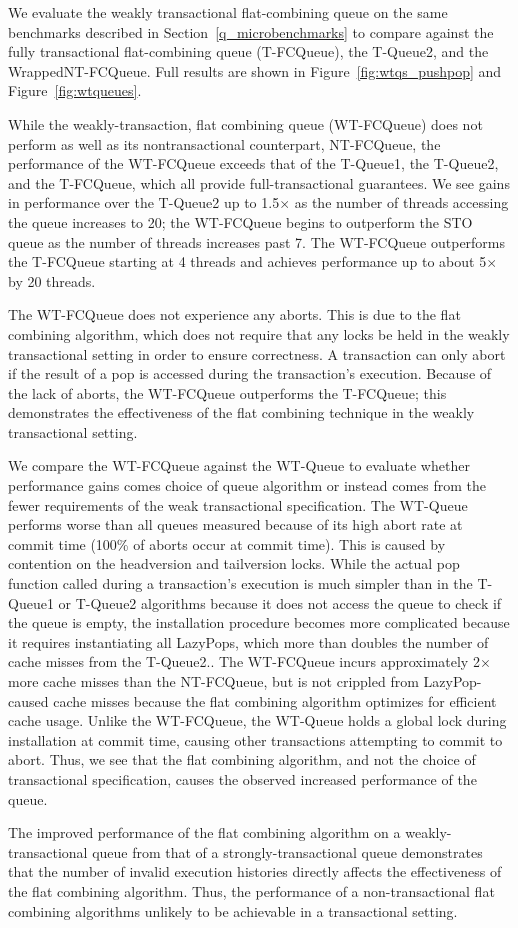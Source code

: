 We evaluate the weakly transactional flat-combining queue on the same benchmarks described in Section~\ref{q_microbenchmarks} to compare against the fully transactional flat-combining queue (T-FCQueue), the T-Queue2, and the WrappedNT-FCQueue. Full results are shown in Figure~\ref{fig:wtqs_pushpop} and Figure~\ref{fig:wtqueues}.

While the weakly-transaction, flat combining queue (WT-FCQueue) does not perform as well as its nontransactional counterpart, NT-FCQueue, the performance of the WT-FCQueue exceeds that of the T-Queue1, the T-Queue2, and the T-FCQueue, which all provide full-transactional guarantees. We see gains in performance over the T-Queue2 up to 1.5$\times$ as the number of threads accessing the queue increases to 20; the WT-FCQueue begins to outperform the STO queue as the number of threads increases past 7. The WT-FCQueue outperforms the T-FCQueue starting at 4 threads and achieves performance up to about 5$\times$ by 20 threads.
 
The WT-FCQueue does not experience any aborts. This is due to the flat combining algorithm, which does not require that any locks be held in the weakly transactional setting in order to ensure correctness. A transaction can only abort if the result of a pop is accessed during the transaction's execution.
Because of the lack of aborts, the WT-FCQueue outperforms the T-FCQueue; this demonstrates the effectiveness of the flat combining technique in the weakly transactional setting. 

We compare the WT-FCQueue against the WT-Queue to evaluate whether performance gains comes choice of queue algorithm or instead comes from the fewer requirements of the weak transactional specification. The WT-Queue performs worse than all queues measured because of its high abort rate at commit time (100\% of aborts occur at commit time). This is caused by contention on the headversion and tailversion locks. While the actual pop function called during a transaction's execution is much simpler than in the T-Queue1 or T-Queue2 algorithms because it does not access the queue to check if the queue is empty, the installation procedure becomes more complicated because it requires instantiating all LazyPops, which more than doubles the number of cache misses from the T-Queue2.. The WT-FCQueue incurs approximately 2$\times$ more cache misses than the NT-FCQueue, but is not crippled from LazyPop-caused cache misses because the flat combining algorithm optimizes for efficient cache usage. Unlike the WT-FCQueue, the WT-Queue holds a global lock during installation at commit time, causing other transactions attempting to commit to abort. Thus, we see that the flat combining algorithm, and not the choice of transactional specification, causes the observed increased performance of the queue.

The improved performance of the flat combining algorithm on a weakly-transactional queue from that of a strongly-transactional queue demonstrates that the number of invalid execution histories directly affects the effectiveness of the flat combining algorithm. Thus, the performance of a non-transactional flat combining algorithms unlikely to be achievable in a transactional setting.
